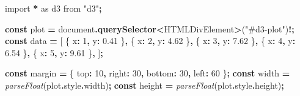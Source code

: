 \documentclass[
]{book}
\newenvironment{Shaded}{\begin{snugshade}}{\end{snugshade}}
\newcommand{\AttributeTok}[1]{\textcolor[rgb]{0.13,0.29,0.53}{#1}}
\newcommand{\BuiltInTok}[1]{#1}
\newcommand{\DataTypeTok}[1]{\textcolor[rgb]{0.13,0.29,0.53}{#1}}
\newcommand{\DecValTok}[1]{\textcolor[rgb]{0.00,0.00,0.81}{#1}}
\newcommand{\FloatTok}[1]{\textcolor[rgb]{0.00,0.00,0.81}{#1}}
\newcommand{\FunctionTok}[1]{\textcolor[rgb]{0.13,0.29,0.53}{\textbf{#1}}}
\newcommand{\ImportTok}[1]{#1}
\newcommand{\KeywordTok}[1]{\textcolor[rgb]{0.13,0.29,0.53}{\textbf{#1}}}
\newcommand{\NormalTok}[1]{#1}
\newcommand{\OperatorTok}[1]{\textcolor[rgb]{0.81,0.36,0.00}{\textbf{#1}}}
\newcommand{\PreprocessorTok}[1]{\textcolor[rgb]{0.56,0.35,0.01}{\textit{#1}}}
\newcommand{\StringTok}[1]{\textcolor[rgb]{0.31,0.60,0.02}{#1}}
\begin{document}
\begin{Shaded}
\begin{Highlighting}[]
\ImportTok{import} \OperatorTok{*} \ImportTok{as}\NormalTok{ d3 }\ImportTok{from} \StringTok{"d3"}\OperatorTok{;}

\KeywordTok{const}\NormalTok{ plot }\OperatorTok{=} \BuiltInTok{document}\OperatorTok{.}\FunctionTok{querySelector}\OperatorTok{\textless{}}\BuiltInTok{HTMLDivElement}\OperatorTok{\textgreater{}}\NormalTok{(}\StringTok{"\#d3{-}plot"}\NormalTok{)}\OperatorTok{!;}
\KeywordTok{const}\NormalTok{ data }\OperatorTok{=}\NormalTok{ [}
\NormalTok{  \{ }\DataTypeTok{x}\OperatorTok{:} \DecValTok{1}\OperatorTok{,} \DataTypeTok{y}\OperatorTok{:} \FloatTok{0.41}\NormalTok{ \}}\OperatorTok{,}
\NormalTok{  \{ }\DataTypeTok{x}\OperatorTok{:} \DecValTok{2}\OperatorTok{,} \DataTypeTok{y}\OperatorTok{:} \FloatTok{4.62}\NormalTok{ \}}\OperatorTok{,}
\NormalTok{  \{ }\DataTypeTok{x}\OperatorTok{:} \DecValTok{3}\OperatorTok{,} \DataTypeTok{y}\OperatorTok{:} \FloatTok{7.62}\NormalTok{ \}}\OperatorTok{,}
\NormalTok{  \{ }\DataTypeTok{x}\OperatorTok{:} \DecValTok{4}\OperatorTok{,} \DataTypeTok{y}\OperatorTok{:} \FloatTok{6.54}\NormalTok{ \}}\OperatorTok{,}
\NormalTok{  \{ }\DataTypeTok{x}\OperatorTok{:} \DecValTok{5}\OperatorTok{,} \DataTypeTok{y}\OperatorTok{:} \FloatTok{9.61}\NormalTok{ \}}\OperatorTok{,}
\NormalTok{]}\OperatorTok{;}

\KeywordTok{const}\NormalTok{ margin }\OperatorTok{=}\NormalTok{ \{ }\DataTypeTok{top}\OperatorTok{:} \DecValTok{10}\OperatorTok{,} \DataTypeTok{right}\OperatorTok{:} \DecValTok{30}\OperatorTok{,} \DataTypeTok{bottom}\OperatorTok{:} \DecValTok{30}\OperatorTok{,} \DataTypeTok{left}\OperatorTok{:} \DecValTok{60}\NormalTok{ \}}\OperatorTok{;}
\KeywordTok{const}\NormalTok{ width }\OperatorTok{=} \PreprocessorTok{parseFloat}\NormalTok{(plot}\OperatorTok{.}\AttributeTok{style}\OperatorTok{.}\AttributeTok{width}\NormalTok{)}\OperatorTok{;}
\KeywordTok{const}\NormalTok{ height }\OperatorTok{=} \PreprocessorTok{parseFloat}\NormalTok{(plot}\OperatorTok{.}\AttributeTok{style}\OperatorTok{.}\AttributeTok{height}\NormalTok{)}\OperatorTok{;}


\end{Highlighting}
\end{Shaded}
\end{document}
